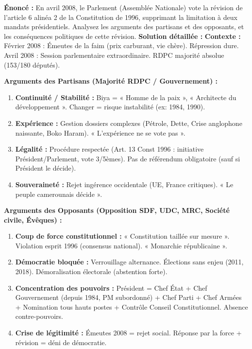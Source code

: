 \documentclass[11pt]{article}
\begin{document}
\begin{exoresolu}
\textbf{Énoncé :} En avril 2008, le Parlement (Assemblée Nationale) vote la révision de l'article 6 alinéa 2 de la Constitution de 1996, supprimant la limitation à deux mandats présidentiels. Analysez les arguments des partisans et des opposants, et les conséquences politiques de cette révision.
\tcblower
\textbf{Solution détaillée :}
\textbf{Contexte :} Février 2008 : Émeutes de la faim (prix carburant, vie chère). Répression dure. Avril 2008 : Session parlementaire extraordinaire. RDPC majorité absolue (153/180 députés).
\par
\textbf{Arguments des Partisans (Majorité RDPC / Gouvernement) :}
\begin{enumerate}
    \item \textbf{Continuité / Stabilité :} Biya = « Homme de la paix », « Architecte du développement ». Changer = risque instabilité (ex: 1984, 1990).
    \item \textbf{Expérience :} Gestion dossiers complexes (Pétrole, Dette, Crise anglophone naissante, Boko Haram). « L'expérience ne se vote pas ».
    \item \textbf{Légalité :} Procédure respectée (Art. 13 Const 1996 : initiative Président/Parlement, vote 3/5èmes). Pas de référendum obligatoire (sauf si Président le décide).
    \item \textbf{Souveraineté :} Rejet ingérence occidentale (UE, France critiques). « Le peuple camerounais décide ».
\end{enumerate}
\textbf{Arguments des Opposants (Opposition SDF, UDC, MRC, Société civile, Évêques) :}
\begin{enumerate}
    \item \textbf{Coup de force constitutionnel :} « Constitution taillée sur mesure ». Violation esprit 1996 (consensus national). « Monarchie républicaine ».
    \item \textbf{Démocratie bloquée :} Verrouillage alternance. Élections sans enjeu (2011, 2018). Démoralisation électorale (abstention forte).
    \item \textbf{Concentration des pouvoirs :} Président = Chef État + Chef Gouvernement (depuis 1984, PM subordonné) + Chef Parti + Chef Armées + Nomination tous hauts postes + Contrôle Conseil Constitutionnel. Absence contre-pouvoirs.
    \item \textbf{Crise de légitimité :} Émeutes 2008 = rejet social. Réponse par la force + révision = déni de démocratie.

\end{enumerate}
\end{exoresolu}
\end{document}
